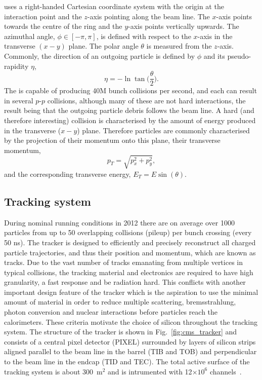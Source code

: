 \CMS uses a right-handed Cartesian coordinate system with the origin at the interaction point and the $z$-axis pointing along the beam line. The $x$-axis points towards the centre of the \LHC ring and the $y$-axis points vertically upwards. The azimuthal angle, $\phi \in [-\pi,\pi]$, is defined with respect to the $x$-axis in the transverse $(x-y)$ plane. The polar angle $\theta$ is measured from the $z$-axis. Commonly, the direction of an outgoing particle is defined by $\phi$ and its pseudo-rapidity $\eta$,
\begin{equation}
	\eta = -\ln\tan\biggl(\frac{\theta}{2}\biggr).
\end{equation}
The \LHC is capable of producing 40M bunch collisions per second, and each can result in several $p$-$p$ collisions, although many of these are not hard interactions, the result being that the outgoing particle debris follows the beam line. A hard (and therefore interesting) collision is characterised by the amount of energy produced in the transverse ($x-y$) plane. Therefore particles are commonly characterised by the projection of their momentum onto this plane, their transverse momentum,
\begin{equation}
	p_{T} = \sqrt{p_{x}^{2}+p_{y}^{2}},
\end{equation}
and the corresponding transverse energy, $E_{T} = E\sin(\theta)$.

\subsection{Tracking system}
\label{sec:tracker}

During nominal \LHC running conditions in 2012 there are on average over 1000 particles from up to 50 overlapping \pp collisions (pileup) per bunch crossing (every 50 ns). The tracker is designed to efficiently and precisely reconstruct all charged particle trajectories, and thus their position and momentum, which are known as tracks. Due to the vast number of tracks emanating from multiple vertices in typical \LHC collisions, the tracking material and electronics are required to have high granularity, a fast response and be radiation hard. This conflicts with another important design feature of the tracker which is the aspiration to use the minimal amount of material in order to reduce multiple scattering, bremsstrahlung, photon conversion and nuclear interactions before particles reach the calorimeters. These criteria motivate the choice of silicon throughout the \CMS tracking system. The structure of the \CMS tracker is shown in Fig.~\ref{fig:cms_tracker} and consists of a central pixel detector (PIXEL) surrounded by layers of silicon strips aligned parallel to the beam line in the barrel (TIB and TOB) and perpendicular to the beam line in the endcap (TID and TEC). The total active surface of the tracking system is about 300~m$^{2}$ and is intrumented with 12$\times10^{6}$ channels~\cite{tracker_project}.

